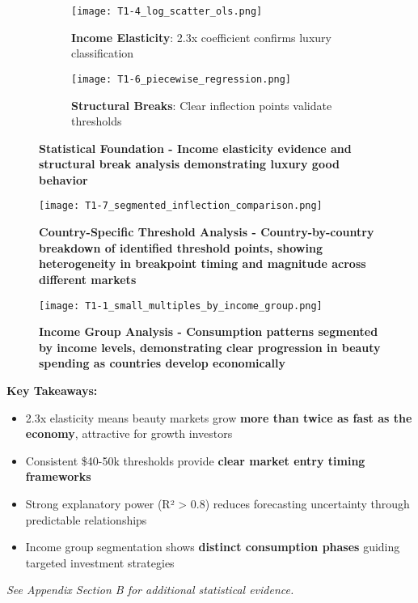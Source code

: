 \documentclass[11pt]{article}
\begin{document}
\begin{figure}[H]
\centering
\begin{subfigure}[b]{0.48\textwidth}
    \texttt{[image: T1-4\_log\_scatter\_ols.png]}
    \caption{\textbf{Income Elasticity}: 2.3x coefficient confirms luxury classification}
\end{subfigure}
\hfill
\begin{subfigure}[b]{0.48\textwidth}
    \texttt{[image: T1-6\_piecewise\_regression.png]}
    \caption{\textbf{Structural Breaks}: Clear inflection points validate thresholds}
\end{subfigure}
\caption{\textbf{Statistical Foundation - Income elasticity evidence and structural break analysis demonstrating luxury good behavior}}
\end{figure}

\begin{figure}[H]
\centering
\texttt{[image: T1-7\_segmented\_inflection\_comparison.png]}
\caption{\textbf{Country-Specific Threshold Analysis - Country-by-country breakdown of identified threshold points, showing heterogeneity in breakpoint timing and magnitude across different markets}}
\end{figure}

\begin{figure}[H]
\centering
\texttt{[image: T1-1\_small\_multiples\_by\_income\_group.png]}
\caption{\textbf{Income Group Analysis - Consumption patterns segmented by income levels, demonstrating clear progression in beauty spending as countries develop economically}}
\end{figure}

\textbf{Key Takeaways:}
\vspace{-5pt}
\begin{itemize}
    \setlength{\itemsep}{-2pt}
    \item 2.3x elasticity means beauty markets grow \textbf{more than twice as fast as the economy}, attractive for growth investors
    \item Consistent \$40-50k thresholds provide \textbf{clear market entry timing frameworks}
    \item Strong explanatory power (R² > 0.8) reduces forecasting uncertainty through predictable relationships
    \item Income group segmentation shows \textbf{distinct consumption phases} guiding targeted investment strategies
\end{itemize}
\textit{See Appendix Section B for additional statistical evidence.}
\end{document}
